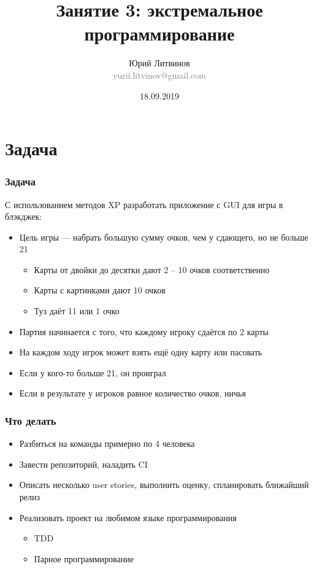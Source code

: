 \documentclass[xetex,mathserif,serif]{beamer}
\title{Занятие 3: экстремальное программирование}
\author[Юрий Литвинов]{Юрий Литвинов\\\small{\textcolor{gray}{yurii.litvinov@gmail.com}}}
\date{18.09.2019}
\begin{document}
	\frame{\titlepage}

	\section{Задача}

	\begin{frame}
		\frametitle{Задача}
		С использованием методов XP разработать приложение с GUI для игры в блэкджек:
		\begin{itemize}
			\item Цель игры --- набрать большую сумму очков, чем у сдающего, но не больше 21
			\begin{itemize}
				\item Карты от двойки до десятки дают 2 -- 10 очков соответственно
				\item Карты с картинками дают 10 очков
				\item Туз даёт 11 или 1 очко
			\end{itemize}
			\item Партия начинается с того, что каждому игроку сдаётся по 2 карты
			\item На каждом ходу игрок может взять ещё одну карту или пасовать
			\item Если у кого-то больше 21, он проиграл
			\item Если в результате у игроков равное количество очков, ничья
		\end{itemize}
	\end{frame}

	\begin{frame}
		\frametitle{Что делать}
		\begin{itemize}
			\item Разбиться на команды примерно по 4 человека
			\item Завести репозиторий, наладить CI
			\item Описать несколько user stories, выполнить оценку, спланировать ближайший релиз
			\item Реализовать проект на любимом языке программирования
			\begin{itemize}
				\item TDD
				\item Парное программирование
			\end{itemize}
		\end{itemize}
	\end{frame}
\end{document}
